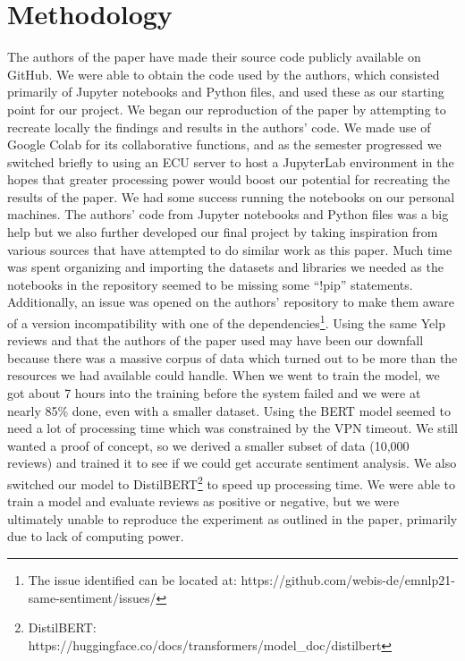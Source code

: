 \documentclass[conference]{IEEEtran}
\begin{document}
\section{Methodology}
	The authors of the paper have made their source code publicly available on GitHub. We were able to obtain the code used by the authors, which consisted primarily of Jupyter notebooks and Python files, and used these as our starting point for our project\cite{project-repo}.
We began our reproduction of the paper by attempting to recreate locally the findings and results in the authors’ code. We made use of Google Colab for its collaborative functions, and as the semester progressed we switched briefly to using an ECU server to host a JupyterLab environment in the hopes that greater processing power would boost our potential for recreating the results of the paper. We had some success running the notebooks on our personal machines.
	The authors’ code from Jupyter notebooks and Python files was a big help but we also further developed our final project by taking inspiration from various sources that have attempted to do similar work as this paper. Much time was spent organizing and importing the datasets and libraries we needed as the notebooks in the repository seemed to be missing some “!pip” statements. Additionally, an issue was opened on the authors’ repository to make them aware of a version incompatibility with one of the dependencies\footnote{The issue identified can be located at: https://github.com/webis-de/emnlp21-same-sentiment/issues/}.
	Using the same Yelp reviews and that the authors of the paper used may have been our downfall because there was a massive corpus of data which turned out to be more than the resources we had available could handle.  When we went to train the model, we got about 7 hours into the training before the system failed and we were at nearly 85\% done, even with a smaller dataset. Using the BERT model seemed to need a lot of processing time which was constrained by the VPN timeout.
	We still wanted a proof of concept, so we derived a smaller subset of data (10,000 reviews) and trained it to see if we could get accurate sentiment analysis. We also switched our model to DistilBERT\footnote{DistilBERT: https://huggingface.co/docs/transformers/model_doc/distilbert} to speed up processing time.  We were able to train a model and evaluate reviews as positive or negative, but we were ultimately unable to reproduce the experiment as outlined in the paper, primarily due to lack of computing power.
\end{document}
